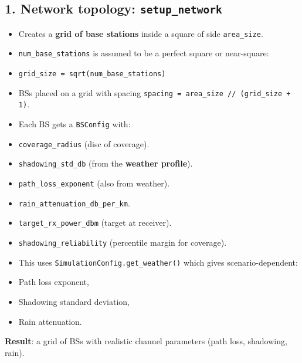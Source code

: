 \documentclass[conference]{IEEEtran}
\begin{document}
\subsection{1. Network topology: \texttt{setup_network}}
\begin{itemize}
\item Creates a \textbf{grid of base stations} inside a square of side \texttt{area\_size}.
\item \texttt{num\_base\_stations} is assumed to be a perfect square or near-square:
\item \texttt{grid\_size = sqrt(num\_base\_stations)}
\item BSs placed on a grid with spacing \texttt{spacing = area\_size // (grid\_size + 1)}.
\item Each BS gets a \texttt{BSConfig} with:
\item \texttt{coverage\_radius} (disc of coverage).
\item \texttt{shadowing\_std\_db} (from the \textbf{weather profile}).
\item \texttt{path\_loss\_exponent} (also from weather).
\item \texttt{rain\_attenuation\_db\_per\_km}.
\item \texttt{target\_rx\_power\_dbm} (target at receiver).
\item \texttt{shadowing\_reliability} (percentile margin for coverage).
\item This uses \texttt{SimulationConfig.get\_weather()} which gives scenario-dependent:
\item Path loss exponent,
\item Shadowing standard deviation,
\item Rain attenuation.
\end{itemize}

\textbf{Result}: a grid of BSs with realistic channel parameters (path loss, shadowing, rain).
\end{document}
